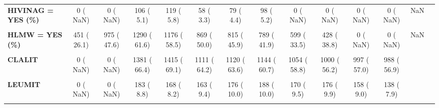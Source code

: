 \documentclass[
]{article}
\begin{document}
\begin{table}[H]
\begin{tabular}[t]{>{\raggedright\arraybackslash}p{5em}ccccccccccccc}
\textbf{HIVINAG = YES (\%)} & 0 (  NaN) & 0 (  NaN) & 106 (  5.1) & 119 (  5.8) & 58 (  3.3) & 79 (  4.4) & 98 (  5.2) & 0 (  NaN) & 0 (  NaN) & 0 (  NaN) & 0 (  NaN) & NaN & \\
\textbf{\cellcolor{gray!10}{HLIPID = YES (\%)}} & \cellcolor{gray!10}{671 ( 39.1)} & \cellcolor{gray!10}{1214 ( 59.3)} & \cellcolor{gray!10}{1591 ( 76.0)} & \cellcolor{gray!10}{1928 ( 93.5)} & \cellcolor{gray!10}{1653 ( 94.7)} & \cellcolor{gray!10}{1727 ( 97.1)} & \cellcolor{gray!10}{1754 ( 93.1)} & \cellcolor{gray!10}{1496 (100.0)} & \cellcolor{gray!10}{1398 ( 94.8)} & \cellcolor{gray!10}{1310 ( 74.9)} & \cellcolor{gray!10}{1082 ( 61.7)} & \cellcolor{gray!10}{<0.001} & \cellcolor{gray!10}{}\\
\textbf{HLMW = YES (\%)} & 451 ( 26.1) & 975 ( 47.6) & 1290 ( 61.6) & 1176 ( 58.5) & 869 ( 50.0) & 815 ( 45.9) & 789 ( 41.9) & 599 ( 33.5) & 428 ( 38.8) & 0 (  NaN) & 0 (  NaN) & NaN & \\
\textbf{\cellcolor{gray!10}{HMO (\%)}} & \cellcolor{gray!10}{} & \cellcolor{gray!10}{} & \cellcolor{gray!10}{} & \cellcolor{gray!10}{} & \cellcolor{gray!10}{} & \cellcolor{gray!10}{} & \cellcolor{gray!10}{} & \cellcolor{gray!10}{} & \cellcolor{gray!10}{} & \cellcolor{gray!10}{} & \cellcolor{gray!10}{} & \cellcolor{gray!10}{NaN} & \cellcolor{gray!10}{}\\
\textbf{CLALIT} & 0 (  NaN) & 0 (  NaN) & 1381 ( 66.4) & 1415 ( 69.1) & 1111 ( 64.2) & 1120 ( 63.6) & 1144 ( 60.7) & 1054 ( 58.8) & 1000 ( 56.2) & 997 ( 57.0) & 988 ( 56.9) &  & \\
\textbf{\cellcolor{gray!10}{IDF}} & \cellcolor{gray!10}{0 (  NaN)} & \cellcolor{gray!10}{0 (  NaN)} & \cellcolor{gray!10}{0 (  0.0)} & \cellcolor{gray!10}{0 (  0.0)} & \cellcolor{gray!10}{0 (  0.0)} & \cellcolor{gray!10}{0 (  0.0)} & \cellcolor{gray!10}{0 (  0.0)} & \cellcolor{gray!10}{0 (  0.0)} & \cellcolor{gray!10}{0 (  0.0)} & \cellcolor{gray!10}{0 (  0.0)} & \cellcolor{gray!10}{2 (  0.1)} & \cellcolor{gray!10}{} & \cellcolor{gray!10}{}\\
\textbf{LEUMIT} & 0 (  NaN) & 0 (  NaN) & 183 (  8.8) & 168 (  8.2) & 163 (  9.4) & 176 ( 10.0) & 188 ( 10.0) & 170 (  9.5) & 176 (  9.9) & 158 (  9.0) & 138 (  7.9) &  & \\
\textbf{\cellcolor{gray!10}{MACCABI}} & \cellcolor{gray!10}{0 (  NaN)} & \cellcolor{gray!10}{0 (  NaN)} & \cellcolor{gray!10}{328 ( 15.8)} & \cellcolor{gray!10}{309 ( 15.1)} & \cellcolor{gray!10}{294 ( 17.0)} & \cellcolor{gray!10}{282 ( 16.0)} & \cellcolor{gray!10}{336 ( 17.8)} & \cellcolor{gray!10}{344 ( 19.2)} & \cellcolor{gray!10}{386 ( 21.7)} & \cellcolor{gray!10}{392 ( 22.4)} & \cellcolor{gray!10}{381 ( 21.9)} & \cellcolor{gray!10}{} & \cellcolor{gray!10}{}\\

\end{tabular}
\end{table}
\end{document}
